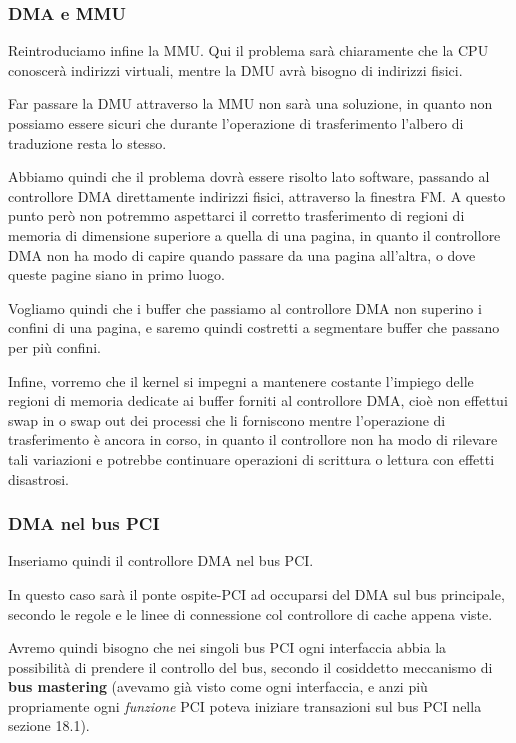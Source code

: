 \documentclass[a4paper,11pt]{article}
\begin{document}
\subsubsection{DMA e MMU}
Reintroduciamo infine la MMU.
Qui il problema sarà chiaramente che la CPU conoscerà indirizzi virtuali, mentre la DMU avrà bisogno di indirizzi fisici.

Far passare la DMU attraverso la MMU non sarà una soluzione, in quanto non possiamo essere sicuri che durante l'operazione di trasferimento l'albero di traduzione resta lo stesso.

Abbiamo quindi che il problema dovrà essere risolto lato software, passando al controllore DMA direttamente indirizzi fisici, attraverso la finestra FM.
A questo punto però non potremmo aspettarci il corretto trasferimento di regioni di memoria di dimensione superiore a quella di una pagina, in quanto il controllore DMA non ha modo di capire quando passare da una pagina all'altra, o dove queste pagine siano in primo luogo.

Vogliamo quindi che i buffer che passiamo al controllore DMA non superino i confini di una pagina, e saremo quindi costretti a segmentare buffer che passano per più confini.

\par\smallskip

Infine, vorremo che il kernel si impegni a mantenere costante l'impiego delle regioni di memoria dedicate ai buffer forniti al controllore DMA, cioè non effettui swap in o swap out dei processi che li forniscono mentre l'operazione di trasferimento è ancora in corso, in quanto il controllore non ha modo di rilevare tali variazioni e potrebbe continuare operazioni di scrittura o lettura con effetti disastrosi.

\subsubsection{DMA nel bus PCI}
Inseriamo quindi il controllore DMA nel bus PCI.

In questo caso sarà il ponte ospite-PCI ad occuparsi del DMA sul bus principale, secondo le regole e le linee di connessione col controllore di cache appena viste.

Avremo quindi bisogno che nei singoli bus PCI ogni interfaccia abbia la possibilità di prendere il controllo del bus, secondo il cosiddetto meccanismo di \textbf{bus mastering} (avevamo già visto come ogni interfaccia, e anzi più propriamente ogni \textit{funzione} PCI poteva iniziare transazioni sul bus PCI nella sezione 18.1).
\end{document}
